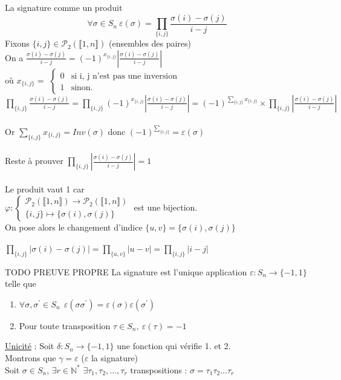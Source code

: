 \documentclass[11pt]{article}
\newcommand*{\N}{\mathbb{N}}
\newcommand*{\lb}{\llbracket}
\newcommand*{\rb}{\rrbracket}
\newcommand*{\n}{\\[0.2cm]}
\newcommand{\0}{\varnothing}
\renewcommand*{\phi}{\varphi}
\newcommand*{\e}{\varepsilon}
\newcommand*{\g}{\gamma}
\newcommand*{\s}{\sigma}
\begin{document}
\begin{prop}{La signature comme un produit}{}
    \begin{equation*}
        \forall  \s \in S_{n} ~ \e(\s) = \prod_{\{i, j\}} \frac{\s(i) - \s(j) }{i - j}
    \end{equation*}
    \tcblower
    Fixons $\{i, j \} \in \mathcal{P}_{2}(\lb 1, n \rb)$ (ensembles des paires)\n
    On a $\frac{\s(i) - \s(j) }{i - j} = (-1)^{x_{\{i, j \}}} |\frac{\s(i) - \s(j) }{i - j}|$\n
    où $x_{\{i, j \}} = $ 
    $\left\{ \begin{array}{ll}
        0 & \mbox{si {i, j} n'est pas une inversion} \\
        1 & \mbox{sinon.}
    \end{array} \right.$\n
    $\prod_{\{i, j\}} \frac{\s(i) - \s(j) }{i - j} = \prod_{\{i, j\}} (-1)^{x_{\{i, j \}}} |\frac{\s(i) - \s(j) }{i - j}| = (-1)^{\sum_{\{i, j \}} x_{\{i, j \}}} \times \prod_{\{i, j\}} |\frac{\s(i) - \s(j) }{i - j}|$\n\n
    Or $\sum_{\{i, j \}} x_{\{i, j \}} = Inv(\s)$ donc $(-1)^{\sum_{\{i, j \}}} = \e(\s)$\n\n
    Reste à prouver $\prod_{\{i, j\}} |\frac{\s(i) - \s(j) }{i - j}| = 1$\n\n
    Le produit vaut 1 car\n
    $\phi : \left\{ \begin{array}{ll}
        \mathcal{P}_{2}(\lb 1, n \rb) \to \mathcal{P}_{2}(\lb 1, n \rb) \\
        \{ i, j \} \mapsto \{ \s(i), \s(j) \}
    \end{array} \right.$ est une bijection. \n
    On pose alors le changement d'indice $\{ u, v \} = \{ \s(i), \s(j) \}$\n\n
    $\prod_{\{i, j\}} |\s(i) - \s(j)| = \prod_{\{u, v\}} |u - v| = \prod_{\{i, j\}} |i - j|$
\end{prop}

\begin{thm}{TODO PREUVE PROPRE}{}
    La signature est l'unique application $\e : S_{n} \to \{ -1, 1 \}$ telle que
    \begin{enumerate}
        \item $\forall \s, \s^{'} \in S_{n} ~~ \e(\s \s^{'}) = \e(\s) \e(\s^{'})$
        \item Pour toute transposition $\tau \in S_{n}, ~ \e(\tau) = -1$
    \end{enumerate}
    \tcblower
    \underline{Unicité} : Soit $\delta : S_{n} \to \{ -1, 1 \}$ une fonction qui vérifie 1. et 2.\n
    Montrons que $\g = \e$ ($\e$ la signature)\n
    Soit $\s \in S_{n}$, $\exists r \in \N^{*}$ $\exists \tau_{1}, \tau_{2}, ..., \tau_{r}$ transpositions : $\s = \tau_{1} \tau_{2} ... \tau_{r}$
\end{thm}
\end{document}
